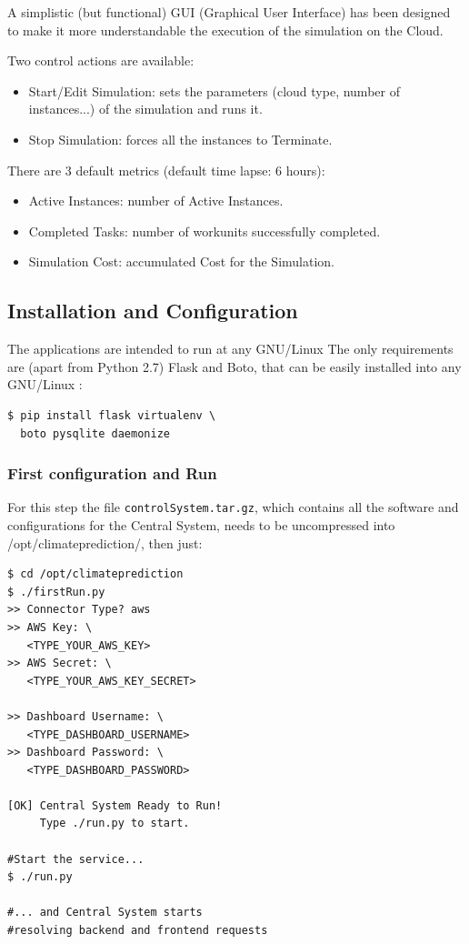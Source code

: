 \documentclass[journal abbreviation, manuscript]{copernicus}
\begin{document}
A simplistic (but functional) GUI (Graphical User Interface) has been designed to make it more understandable the execution of the simulation on the Cloud.

Two control actions are available:

\begin{itemize}
	\item Start/Edit Simulation: sets the parameters (cloud type, number of instances...) of the simulation and runs it.
    \item Stop Simulation: forces all the instances to Terminate.
\end{itemize}

There are 3 default metrics (default time lapse: 6 hours):

\begin{itemize}
  \item Active Instances: number of Active Instances.
  \item Completed Tasks: number of workunits successfully completed.
  \item Simulation Cost: accumulated Cost for the Simulation.
\end{itemize}

\subsection{Installation and Configuration}

The applications are intended to run at any GNU/Linux The only requirements are (apart from Python 2.7) Flask and Boto, that can be easily installed into any GNU/Linux :

\begin{verbatim}
$ pip install flask virtualenv \
  boto pysqlite daemonize
\end{verbatim}

\subsubsection{First configuration and Run}

For this step the file \texttt{controlSystem.tar.gz}, which contains all the software and configurations for the Central System, needs to be uncompressed into /opt/climateprediction/, then just:


\begin{verbatim}
$ cd /opt/climateprediction
$ ./firstRun.py
>> Connector Type? aws
>> AWS Key: \
   <TYPE_YOUR_AWS_KEY>
>> AWS Secret: \
   <TYPE_YOUR_AWS_KEY_SECRET>

>> Dashboard Username: \
   <TYPE_DASHBOARD_USERNAME>
>> Dashboard Password: \
   <TYPE_DASHBOARD_PASSWORD>

[OK] Central System Ready to Run!
     Type ./run.py to start.

#Start the service...
$ ./run.py

#... and Central System starts
#resolving backend and frontend requests
\end{verbatim}
\end{document}
